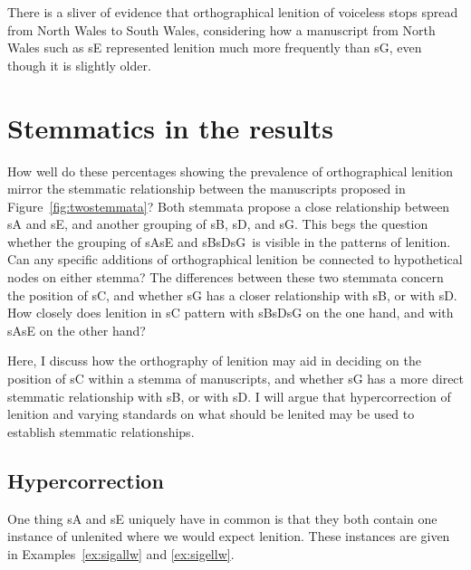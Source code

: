 There is a sliver of evidence that orthographical lenition of voiceless stops spread from North Wales to South Wales, considering how a manuscript from North Wales such as \gls{sE} represented lenition much more frequently than \gls{sG}, even though it is slightly older.

\section{Stemmatics in the results}
\label{sec:stemmatics-laws}


How well do these percentages showing the prevalence of orthographical lenition mirror the stemmatic relationship between the manuscripts proposed in Figure~\ref{fig:twostemmata}? Both stemmata propose a close relationship between \gls{sA} and \gls{sE}, and another grouping of \gls{sB}, \gls{sD}, and \gls{sG}. This begs the question whether the grouping of \gls{sA}\gls{sE} and \gls{sB}\gls{sD}\gls{sG}\ is visible in the patterns of lenition. Can any specific additions of orthographical lenition be connected to hypothetical nodes on either stemma? The differences between these two stemmata concern the position of \gls{sC}, and whether \gls{sG} has a closer relationship with \gls{sB}, or with \gls{sD}. How closely does lenition in \gls{sC} pattern with \gls{sB}\gls{sD}\gls{sG} on the one hand, and with \gls{sA}\gls{sE} on the other hand?  

Here, I discuss how the orthography of lenition may aid in deciding on the position of \gls{sC} within a stemma of manuscripts, and whether \gls{sG} has a more direct stemmatic relationship with \gls{sB}, or with \gls{sD}. I will argue that hypercorrection of lenition and varying standards on what should be lenited may be used to establish stemmatic relationships.
\subsection{Hypercorrection}
\label{sec:hypercorrection}


One thing \gls{sA} and \gls{sE} uniquely have in common is that they both contain one instance of unlenited  where we would expect lenition. These instances are given in Examples~\ref{ex:sigallw} and \ref{ex:sigellw}.
\begin{mwl}
\end{mwl}


